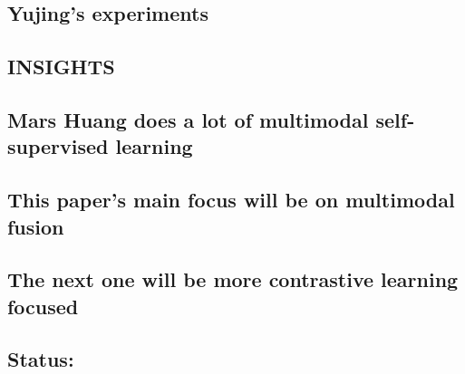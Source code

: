 \documentclass{article}%
\begin{document}
\subsection{Yujing’s experiments  }%
\label{subsec:Yujingsexperiments}%

%
\subsection{INSIGHTS }%
\label{subsec:INSIGHTS}%

%
\subsection{Mars Huang does a lot of multimodal self{-}supervised learning }%
\label{subsec:MarsHuangdoesalotofmultimodalself{-}supervisedlearning}%

%
\subsection{This paper’s main focus will be on multimodal fusion }%
\label{subsec:Thispapersmainfocuswillbeonmultimodalfusion}%

%
\subsection{The next one will be more contrastive learning focused }%
\label{subsec:Thenextonewillbemorecontrastivelearningfocused}%

%
\subsection{Status: }%
\label{subsec:Status}%
\end{document}
